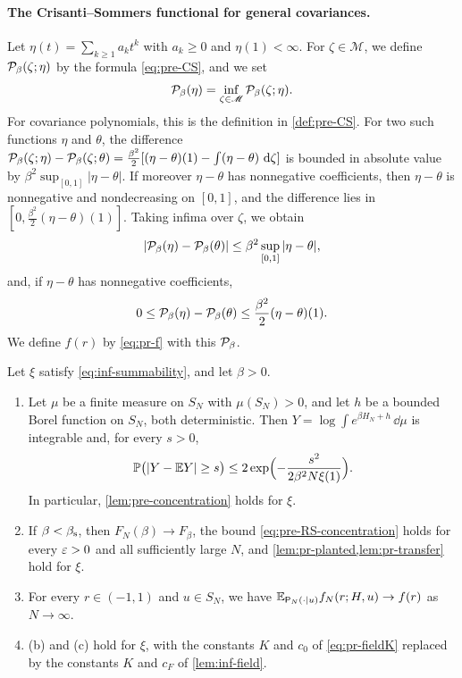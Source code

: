\paragraph{The Crisanti--Sommers functional for general covariances.} Let $\eta(t)=\sum_{k\ge1}a_kt^k$ with $a_k\ge0$ and $\eta(1)<\infty$. For $\zeta\in\mathscr M$, we define $\mathcal P_\beta(\zeta;\eta)$ by the formula \eqref{eq:pre-CS}, and we set
\begin{equation*}
\mathcal P_\beta(\eta)=\inf_{\zeta\in\mathscr M}\mathcal P_\beta(\zeta;\eta).
\end{equation*}
For covariance polynomials, this is the definition in \cref{def:pre-CS}. For two such functions $\eta$ and $\theta$, the difference $\mathcal P_\beta(\zeta;\eta)-\mathcal P_\beta(\zeta;\theta)=\frac{\beta^2}2[(\eta-\theta)(1)-\int(\eta-\theta)\,\,\mathrm d\zeta]$ is bounded in absolute value by $\beta^2\sup_{[0,1]}|\eta-\theta|$. If moreover $\eta-\theta$ has nonnegative coefficients, then $\eta-\theta$ is nonnegative and nondecreasing on $[0,1]$, and the difference lies in $[0,\frac{\beta^2}2(\eta-\theta)(1)]$. Taking infima over $\zeta$, we obtain
\begin{equation}\label{eq:inf-CS-compare}
|\mathcal P_\beta(\eta)-\mathcal P_\beta(\theta)|\le\beta^2\sup_{[0,1]}|\eta-\theta|,
\end{equation}
and, if $\eta-\theta$ has nonnegative coefficients,
\begin{equation}\label{eq:inf-CS-monotone}
0\le\mathcal P_\beta(\eta)-\mathcal P_\beta(\theta)\le\frac{\beta^2}2(\eta-\theta)(1).
\end{equation}
We define $f(r)$ by \eqref{eq:pr-f} with this $\mathcal P_\beta$.

\begin{lemma}\label{lem:inf-pressure}
Let $\xi$ satisfy \eqref{eq:inf-summability}, and let $\beta>0$.
\begin{enumerate}
\item Let $\mu$ be a finite measure on $S_N$ with $\mu(S_N)>0$, and let $h$ be a bounded Borel function on $S_N$, both deterministic. Then $Y=\log\int e^{\beta H_N+h}\,\dd\mu$ is integrable and, for every $s>0$,
\begin{equation}\label{eq:inf-conc}
\mathbb P\bigl(|Y-\mathbb E Y|\ge s\bigr)\le2\exp\Bigl(-\frac{s^2}{2\beta^2N\xi(1)}\Bigr).
\end{equation}
In particular, \cref{lem:pre-concentration} holds for $\xi$.
\item If $\beta<\beta_{\mathrm s}$, then $F_N(\beta)\to F_\beta$, the bound \eqref{eq:pre-RS-concentration} holds for every $\varepsilon>0$ and all sufficiently large $N$, and \cref{lem:pr-planted,lem:pr-transfer} hold for $\xi$.
\item For every $r\in(-1,1)$ and $u\in S_N$, we have $\mathbb E_{\mathsf P_N(\cdot\mid u)}f_N(r;H,u)\to f(r)$ as $N\to\infty$.
\item {}(b) and (c) hold for $\xi$, with the constants $K$ and $c_0$ of \eqref{eq:pr-fieldK} replaced by the constants $K$ and $c_F$ of \cref{lem:inf-field}.
\end{enumerate}
\end{lemma}

